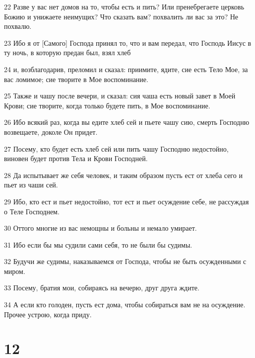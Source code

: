 \par 22 Разве у вас нет домов на то, чтобы есть и пить? Или пренебрегаете церковь Божию и унижаете неимущих? Что сказать вам? похвалить ли вас за это? Не похвалю.
\par 23 Ибо я от [Самого] Господа принял то, что и вам передал, что Господь Иисус в ту ночь, в которую предан был, взял хлеб
\par 24 и, возблагодарив, преломил и сказал: приимите, ядите, сие есть Тело Мое, за вас ломимое; сие творите в Мое воспоминание.
\par 25 Также и чашу после вечери, и сказал: сия чаша есть новый завет в Моей Крови; сие творите, когда только будете пить, в Мое воспоминание.
\par 26 Ибо всякий раз, когда вы едите хлеб сей и пьете чашу сию, смерть Господню возвещаете, доколе Он придет.
\par 27 Посему, кто будет есть хлеб сей или пить чашу Господню недостойно, виновен будет против Тела и Крови Господней.
\par 28 Да испытывает же себя человек, и таким образом пусть ест от хлеба сего и пьет из чаши сей.
\par 29 Ибо, кто ест и пьет недостойно, тот ест и пьет осуждение себе, не рассуждая о Теле Господнем.
\par 30 Оттого многие из вас немощны и больны и немало умирает.
\par 31 Ибо если бы мы судили сами себя, то не были бы судимы.
\par 32 Будучи же судимы, наказываемся от Господа, чтобы не быть осужденными с миром.
\par 33 Посему, братия мои, собираясь на вечерю, друг друга ждите.
\par 34 А если кто голоден, пусть ест дома, чтобы собираться вам не на осуждение. Прочее устрою, когда приду.

\chapter{12}

